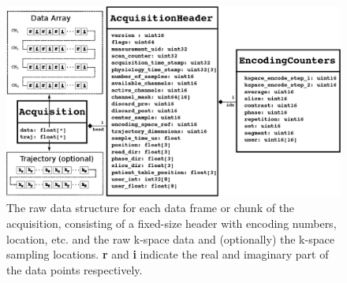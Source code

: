 \documentclass[12pt, draft]{article}
\begin{document}
\begin{figure}
\begin{center}
\includegraphics[width=6in]{figure2_uml_diagram.eps}
\caption{The raw data structure for each data frame or chunk of the acquisition, consisting of a fixed-size header with encoding numbers, location, etc. and the raw k-space data and (optionally) the k-space sampling locations. \textbf{r} and \textbf{i} indicate the real and imaginary part of the data points respectively.}
\label{fig:cstruct}
\end{center}
\end{figure}
\end{document}
